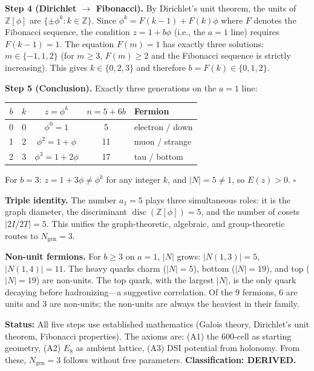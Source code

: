 \documentclass[12pt,a4paper]{article}
\begin{document}
\textbf{Step 4 (Dirichlet $\to$ Fibonacci).} By Dirichlet's unit theorem, the units of $\mathbb{Z}[\phi]$ are $\{\pm\phi^k : k \in \mathbb{Z}\}$. Since $\phi^k = F(k\!-\!1) + F(k)\phi$ where $F$ denotes the Fibonacci sequence, the condition $z = 1 + b\phi$ (i.e., the $a = 1$ line) requires $F(k\!-\!1) = 1$. The equation $F(m) = 1$ has exactly three solutions: $m \in \{-1, 1, 2\}$ (for $m \geq 3$, $F(m) \geq 2$ and the Fibonacci sequence is strictly increasing). This gives $k \in \{0, 2, 3\}$ and therefore $b = F(k) \in \{0, 1, 2\}$.

\textbf{Step 5 (Conclusion).} Exactly three generations on the $a = 1$ line:
\begin{center}
\begin{tabular}{ccccl}
\toprule
$b$ & $k$ & $z = \phi^k$ & $n = 5+6b$ & Fermion \\
\midrule
0 & 0 & $\phi^0 = 1$ & 5 & electron / down \\
1 & 2 & $\phi^2 = 1+\phi$ & 11 & muon / strange \\
2 & 3 & $\phi^3 = 1+2\phi$ & 17 & tau / bottom \\
\bottomrule
\end{tabular}
\end{center}
For $b = 3$: $z = 1 + 3\phi \neq \phi^k$ for any integer $k$, and $|N| = 5 \neq 1$, so $E(z) > 0$. \hfill $\square$

\textbf{Triple identity.} The number $a_1 = 5$ plays three simultaneous roles: it is the graph diameter, the discriminant $\operatorname{disc}(\mathbb{Z}[\phi]) = 5$, and the number of cosets $|2I/2T| = 5$. This unifies the graph-theoretic, algebraic, and group-theoretic routes to $N_{\text{gen}} = 3$.

\textbf{Non-unit fermions.} For $b \geq 3$ on $a = 1$, $|N|$ grows: $|N(1,3)| = 5$, $|N(1,4)| = 11$. The heavy quarks charm ($|N| = 5$), bottom ($|N| = 19$), and top ($|N| = 19$) are non-units. The top quark, with the largest $|N|$, is the only quark decaying before hadronizing---a suggestive correlation. Of the 9 fermions, 6 are units and 3 are non-units; the non-units are always the heaviest in their family.

\textbf{Status:} All five steps use established mathematics (Galois theory, Dirichlet's unit theorem, Fibonacci properties). The axioms are: (A1) the 600-cell as starting geometry, (A2) $E_8$ as ambient lattice, (A3) DSI potential from holonomy. From these, $N_{\text{gen}} = 3$ follows without free parameters. \textbf{Classification: DERIVED.}
\end{document}
